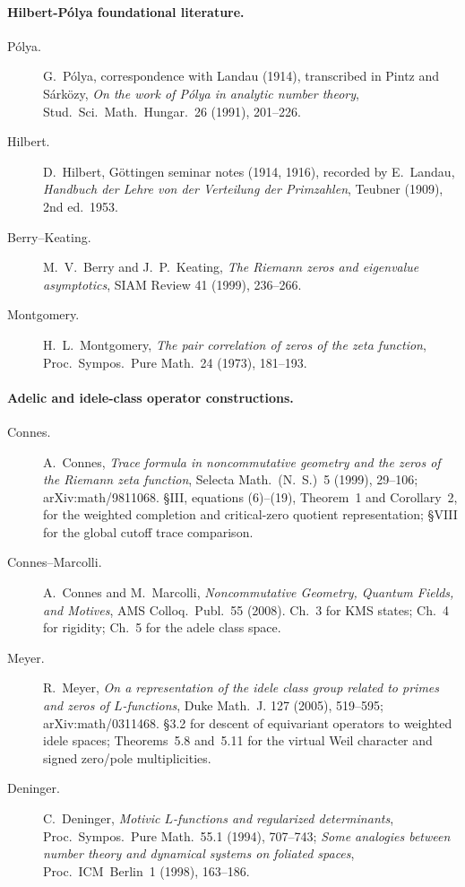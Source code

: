 \paragraph{Hilbert-P\'olya foundational literature.}
\begin{description}
\item[P\'olya.] G.~P\'olya, correspondence with Landau (1914),
transcribed in Pintz and S\'ark\"ozy, \emph{On the work of P\'olya in
analytic number theory}, Stud.~Sci.~Math.~Hungar.~26 (1991), 201--226.
\item[Hilbert.] D.~Hilbert, G\"ottingen seminar notes (1914, 1916),
recorded by E.~Landau, \emph{Handbuch der Lehre von der Verteilung der
Primzahlen}, Teubner (1909), 2nd ed.~1953.
\item[Berry--Keating.] M.~V.~Berry and J.~P.~Keating, \emph{The
Riemann zeros and eigenvalue asymptotics}, SIAM Review 41 (1999),
236--266.
\item[Montgomery.] H.~L.~Montgomery, \emph{The pair correlation of zeros
of the zeta function}, Proc.~Sympos.~Pure Math.~24 (1973), 181--193.
\end{description}

\paragraph{Adelic and idele-class operator constructions.}
\begin{description}
\item[Connes.] A.~Connes, \emph{Trace formula in noncommutative
geometry and the zeros of the Riemann zeta function}, Selecta
Math.~(N.~S.)~5 (1999), 29--106; arXiv:math/9811068. \S III, equations (6)--(19), Theorem~1 and Corollary~2, for
the weighted completion and critical-zero quotient representation;
\S VIII for the global cutoff trace comparison.
\item[Connes--Marcolli.] A.~Connes and M.~Marcolli, \emph{Noncommutative
Geometry, Quantum Fields, and Motives}, AMS Colloq.~Publ.~55 (2008).
Ch.~3 for KMS states; Ch.~4 for rigidity; Ch.~5 for the adele class
space.
\item[Meyer.] R.~Meyer, \emph{On a representation of the idele class
group related to primes and zeros of \(L\)-functions}, Duke Math.~J.
127 (2005), 519--595; arXiv:math/0311468. \S3.2 for descent of equivariant operators to weighted idele spaces;
Theorems~5.8 and~5.11 for the virtual Weil character and signed
zero/pole multiplicities.
\item[Deninger.] C.~Deninger, \emph{Motivic \(L\)-functions and
regularized determinants}, Proc.~Sympos.~Pure Math.~55.1 (1994),
707--743; \emph{Some analogies between number theory and dynamical
systems on foliated spaces}, Proc.~ICM~Berlin~1 (1998), 163--186.
\end{description}

